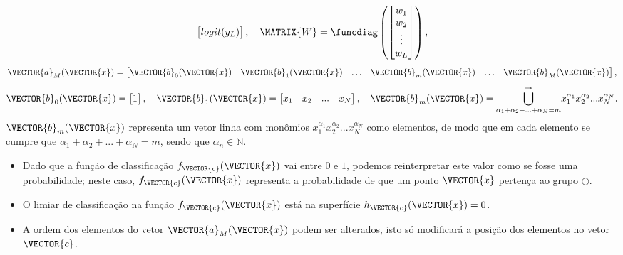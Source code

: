 \begin{theorem}
\begin{equation}
\begin{bmatrix}
logit(y_L) \\
\end{bmatrix},
\quad
\MATRIX{W}=\funcdiag \left(
\begin{bmatrix}
w_1  \\
w_2  \\
\vdots \\
w_L \\
\end{bmatrix} \right),
\end{equation}
\begin{equation}\label{eq:reglogrnr1poly:3}
\VECTOR{a}_M(\VECTOR{x})=
\begin{bmatrix}
\VECTOR{b}_0(\VECTOR{x}) &
\VECTOR{b}_1(\VECTOR{x}) &
\hdots &
\VECTOR{b}_m(\VECTOR{x}) &
\hdots &
\VECTOR{b}_M(\VECTOR{x}) 
\end{bmatrix},
\end{equation}
\begin{equation}\label{eq:reglogrnr1poly:4}
\VECTOR{b}_0(\VECTOR{x})=
\begin{bmatrix}
1 
\end{bmatrix},
\quad 
\VECTOR{b}_1(\VECTOR{x})=
\begin{bmatrix}
x_1 & x_2 & ... &  x_N
\end{bmatrix},
\quad 
\VECTOR{b}_m(\VECTOR{x})=
{\bigcup\limits_{\alpha_1+\alpha_2+...+\alpha_N=m}^{\rightarrow}}{x_1^{\alpha_1} x_2^{\alpha_2} ... x_N^{\alpha_N}} .
\end{equation}
$\VECTOR{b}_m(\VECTOR{x})$ representa um vetor linha com monômios $x_1^{\alpha_1} x_2^{\alpha_2} ... x_N^{\alpha_N}$
como elementos, de modo que em cada elemento se cumpre que $\alpha_1+\alpha_2+...+\alpha_N=m$,
sendo que $\alpha_n \in \mathbb{N}$.
\end{theorem}

\begin{tcbattention}
\begin{itemize}
\item Dado que a função de classificação $f_{\VECTOR{c}}(\VECTOR{x})$ vai entre $0$ e $1$,
podemos reinterpretar este valor como se fosse uma probabilidade;
neste caso, $f_{\VECTOR{c}}(\VECTOR{x})$ representa a probabilidade de que um ponto $\VECTOR{x}$
pertença ao grupo $\bigcirc$.
\item O limiar de classificação na função $f_{\VECTOR{c}}(\VECTOR{x})$ está na superfície $h_{\VECTOR{c}}(\VECTOR{x})=0$.
\item A ordem dos elementos do vetor $\VECTOR{a}_M(\VECTOR{x})$ podem ser alterados,
isto só modificará a posição dos elementos no vetor $\VECTOR{c}$.
\end{itemize}
\end{tcbattention}


